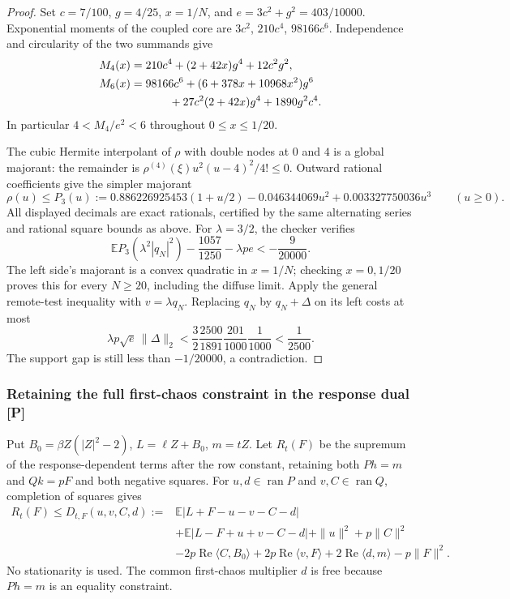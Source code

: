 \begin{proof}
Set $c=7/100$, $g=4/25$, $x=1/N$, and $e=3c^2+g^2=403/10000$.
Exponential moments of the coupled core are $3c^2$, $210c^4$,
$98166c^6$. Independence and circularity of the two summands give
\begin{align*}
 M_4(x)&=210c^4+(2+42x)g^4+12c^2g^2,\\
 M_6(x)&=98166c^6+(6+378x+10968x^2)g^6\\
 &\hspace{12mm}+27c^2(2+42x)g^4+1890g^2c^4.
\end{align*}
In particular $4<M_4/e^2<6$ throughout $0\le x\le1/20$.

The cubic Hermite interpolant of $\rho$ with double nodes at $0$ and $4$
is a global majorant: the remainder is
$\rho^{(4)}(\xi)u^2(u-4)^2/4!\le0$.
Outward rational coefficients give the simpler majorant
\[
 \rho(u)\le P_3(u):=
 0.886226925453(1+u/2)-0.046344069u^2+0.003327750036u^3
 \qquad(u\ge0).
\]
All displayed decimals are exact rationals, certified by the same
alternating series and rational square bounds as above.
For $\lambda=3/2$, the checker verifies
\[
 \mathbb E P_3(\lambda^2|q_N|^2)
   -\frac{1057}{1250}-\lambda pe<-\frac9{20000}.
\]
The left side's majorant is a convex quadratic in $x=1/N$; checking
$x=0,1/20$ proves this for every $N\ge20$, including the diffuse limit.
Apply the general remote-test inequality with $v=\lambda q_N$.
Replacing $q_N$ by $q_N+\Delta$ on its left costs at most
\[
 \lambda p\sqrt e\,\|\Delta\|_2
 <\frac32\frac{2500}{1891}\frac{201}{1000}\frac1{1000}
 <\frac1{2500}.
\]
The support gap is still less than $-1/20000$, a contradiction.
\end{proof}

\subsubsection{Retaining the full first-chaos constraint in the response dual [P]}
Put $B_0=\beta Z(|Z|^2-2)$, $L=\ell Z+B_0$, $m=tZ$.
Let $R_t(F)$ be the supremum of the response-dependent terms after the
row constant, retaining both $Ph=m$ and $Qk=pF$ and both negative
squares. For $u,d\in\operatorname{ran}P$ and
$v,C\in\operatorname{ran}Q$, completion of squares gives
\begin{align}
R_t(F)\le D_{t,F}(u,v,C,d):={}&
\mathbb E|L+F-u-v-C-d|\nonumber\\
&+\mathbb E|L-F+u+v-C-d|
 +\|u\|^2+p\|C\|^2\nonumber\\
&-2p\operatorname{Re}\langle C,B_0\rangle
 +2p\operatorname{Re}\langle v,F\rangle
 +2\operatorname{Re}\langle d,m\rangle-p\|F\|^2.
\label{eq:fixed-first-response-dual}
\end{align}
No stationarity is used. The common first-chaos multiplier $d$ is free
because $Ph=m$ is an equality constraint.

